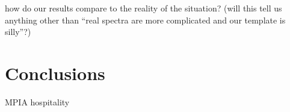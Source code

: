\documentclass[modern]{aastex61}
\begin{document}
how do our results compare to the reality of the situation? (will this tell us anything other than ``real spectra are more complicated and our template is silly''?)


\section{Conclusions}

\acknowledgements
MPIA hospitality


\end{document}
